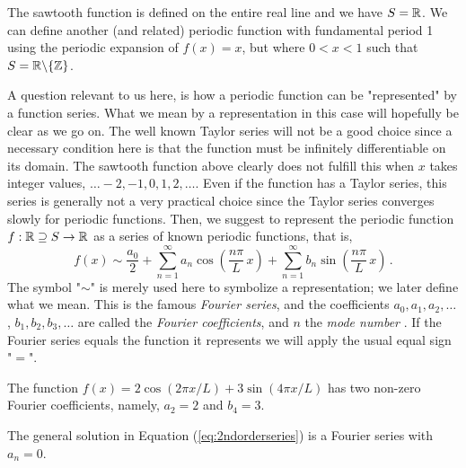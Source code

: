 The sawtooth function is defined on the entire real line and we have $S=\mathbb{R}$. We can define 
another (and related) periodic function with fundamental period 1 using the 
periodic expansion of $f(x)=x$, but where $0 < x < 1$ such that $S=\mathbb{R} \backslash \{\mathbb{Z}\}$. 

A question relevant to us here, is how a periodic function can be "represented" by a function 
series. What we mean by a representation in this case will hopefully be clear as we go on. 
The well known Taylor series will not be a good choice since a necessary condition here 
is that the function must be infinitely differentiable on its domain. The sawtooth function 
above clearly does not fulfill this when $x$ takes integer values, $\ldots -2,-1,0,1,2, \ldots$. 
Even if the function has a Taylor series, this series is generally not a very practical 
choice since the Taylor series converges slowly for periodic functions. 
Then, we suggest to represent the periodic function
$f: \mathbb{R} \supseteq S \rightarrow \mathbb{R}$ as a series of known periodic functions, that is, 
\begin{equation}
	\label{eq:Fouriereq}
	f(x) \sim \frac{a_0}{2} + \sum_{n=1}^\infty a_n \cos\left(\frac{n\pi }{L} \, x\right) 
	+ \sum_{n=1}^\infty b_n \sin\left(\frac{n\pi }{L} \, x\right) \, .
\end{equation}
The symbol "$\sim$" is merely used here to symbolize a representation; we later define what
we mean. This is the famous \emph{Fourier series}, 
 and the 
coefficients $a_0, a_1, a_2, \ldots$, $b_1, b_2, b_3, \ldots$ are called the 
\emph{Fourier coefficients}, and $n$ the \emph{mode number}
. If the Fourier series equals the function it represents we will
apply the usual equal sign "$=$". 

\begin{example}
	The function $f(x) = 2\cos(2\pi x/L) + 3\sin(4\pi x/L)$ has two non-zero 
	Fourier coefficients, namely, $a_2=2$ and $b_4=3$. 
\end{example}

\begin{example}
	The general solution in Equation (\ref{eq:2ndorderseries}) is a Fourier series with $a_n = 0$.
\end{example}

